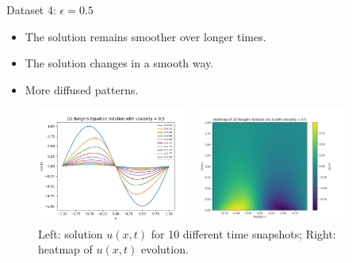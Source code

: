 \begin{secframe}

\begin{block}{Dataset 4: $\epsilon = 0.5$}
\begin{itemize}
  \item \small The solution remains smoother over longer times.
  \item \small The solution changes in a smooth way.
  \item \small More diffused patterns. 
\end{itemize}
\end{block}

\begin{figure}[h!]
    \centering
    \begin{minipage}[t]{0.48\linewidth}
        \centering
        \includegraphics[height=3.8cm]{images/graphical_visualization_1DBurgers_visc_05.png}
    \end{minipage}\hfill
    \begin{minipage}[t]{0.48\linewidth}
        \centering
        \includegraphics[height=3.8cm]{images/Heatmap_1DBurgers_visc_05.png}
    \end{minipage}
    \caption{\scriptsize Left: solution $u(x,t)$ for 10 different time snapshots; Right: heatmap of $u(x,t)$ evolution.}
\end{figure}
\end{secframe}